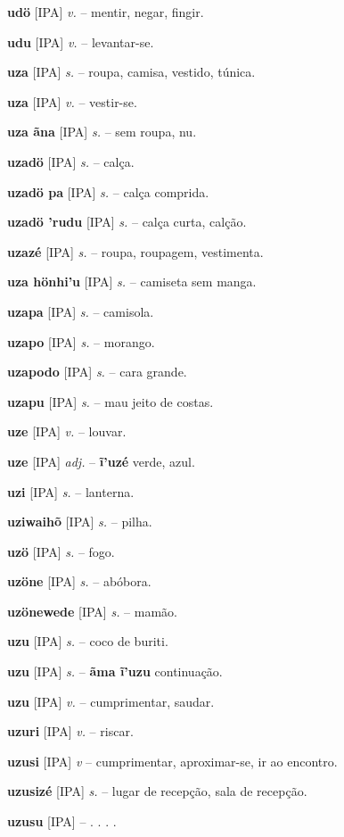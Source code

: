 \textbf{udö} [IPA] \textit{v.} -- mentir, negar, fingir.

\textbf{udu} [IPA] \textit{v.} -- levantar-se.

\textbf{uza} [IPA] \textit{s.} -- roupa, camisa, vestido, túnica.

\textbf{uza} [IPA] \textit{v.} -- vestir-se.

\textbf{uza ãna} [IPA] \textit{s.} -- sem roupa, nu.

\textbf{uzadö} [IPA] \textit{s.} -- calça.

\textbf{uzadö pa} [IPA] \textit{s.} -- calça comprida.

\textbf{uzadö 'rudu} [IPA] \textit{s.} -- calça curta, calção.

\textbf{uzazé} [IPA] \textit{s.} -- roupa, roupagem, vestimenta.

\textbf{uza hönhi'u} [IPA] \textit{s.} -- camiseta sem manga.

\textbf{uzapa} [IPA] \textit{s.} -- camisola.

\textbf{uzapo} [IPA] \textit{s.} -- morango.

\textbf{uzapodo} [IPA] \textit{s.} -- cara grande.

\textbf{uzapu} [IPA] \textit{s.} -- mau jeito de costas.

\textbf{uze} [IPA] \textit{v.} -- louvar.

\textbf{uze} [IPA] \textit{adj.} -- \textbf{ĩ'uzé} verde, azul.

\textbf{uzi} [IPA] \textit{s.} -- lanterna.

\textbf{uziwaihõ} [IPA] \textit{s.} -- pilha.

\textbf{uzö} [IPA] \textit{s.} -- fogo.

\textbf{uzöne} [IPA] \textit{s.} -- abóbora.

\textbf{uzönewede} [IPA] \textit{s.} -- mamão.

\textbf{uzu} [IPA] \textit{s.} -- coco de buriti.

\textbf{uzu} [IPA] \textit{s.} -- \textbf{ãma ĩ'uzu} continuação.

\textbf{uzu} [IPA] \textit{v.} -- cumprimentar, saudar.

\textbf{uzuri} [IPA] \textit{v.} -- riscar.

\textbf{uzusi} [IPA] \textit{v} -- cumprimentar, aproximar-se, ir ao encontro.

\textbf{uzusizé} [IPA] \textit{s.} -- lugar de recepção, sala de recepção.

\textbf{uzusu} [IPA] \textit{} -- . . . .

